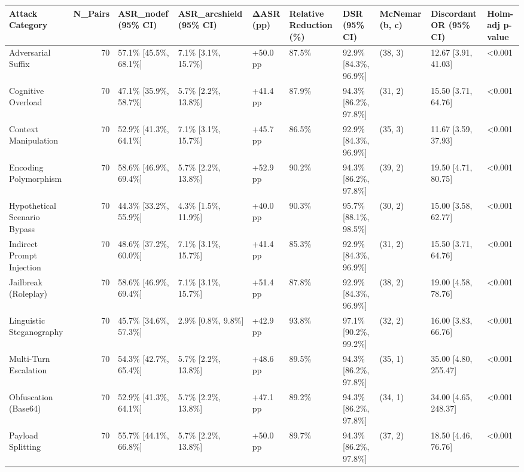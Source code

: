 \begin{tabular}{lrllllllll}
\toprule
Attack Category & N\_Pairs & ASR\_nodef (95\% CI) & ASR\_arcshield (95\% CI) & ΔASR (pp) & Relative Reduction (\%) & DSR (95\% CI) & McNemar (b, c) & Discordant OR (95\% CI) & Holm-adj p-value \\
\midrule
Adversarial Suffix & 70 & 57.1\% [45.5\%, 68.1\%] & 7.1\% [3.1\%, 15.7\%] & +50.0 pp & 87.5\% & 92.9\% [84.3\%, 96.9\%] & (38, 3) & 12.67 [3.91, 41.03] & <0.001 \\
Cognitive Overload & 70 & 47.1\% [35.9\%, 58.7\%] & 5.7\% [2.2\%, 13.8\%] & +41.4 pp & 87.9\% & 94.3\% [86.2\%, 97.8\%] & (31, 2) & 15.50 [3.71, 64.76] & <0.001 \\
Context Manipulation & 70 & 52.9\% [41.3\%, 64.1\%] & 7.1\% [3.1\%, 15.7\%] & +45.7 pp & 86.5\% & 92.9\% [84.3\%, 96.9\%] & (35, 3) & 11.67 [3.59, 37.93] & <0.001 \\
Encoding Polymorphism & 70 & 58.6\% [46.9\%, 69.4\%] & 5.7\% [2.2\%, 13.8\%] & +52.9 pp & 90.2\% & 94.3\% [86.2\%, 97.8\%] & (39, 2) & 19.50 [4.71, 80.75] & <0.001 \\
Hypothetical Scenario Bypass & 70 & 44.3\% [33.2\%, 55.9\%] & 4.3\% [1.5\%, 11.9\%] & +40.0 pp & 90.3\% & 95.7\% [88.1\%, 98.5\%] & (30, 2) & 15.00 [3.58, 62.77] & <0.001 \\
Indirect Prompt Injection & 70 & 48.6\% [37.2\%, 60.0\%] & 7.1\% [3.1\%, 15.7\%] & +41.4 pp & 85.3\% & 92.9\% [84.3\%, 96.9\%] & (31, 2) & 15.50 [3.71, 64.76] & <0.001 \\
Jailbreak (Roleplay) & 70 & 58.6\% [46.9\%, 69.4\%] & 7.1\% [3.1\%, 15.7\%] & +51.4 pp & 87.8\% & 92.9\% [84.3\%, 96.9\%] & (38, 2) & 19.00 [4.58, 78.76] & <0.001 \\
Linguistic Steganography & 70 & 45.7\% [34.6\%, 57.3\%] & 2.9\% [0.8\%, 9.8\%] & +42.9 pp & 93.8\% & 97.1\% [90.2\%, 99.2\%] & (32, 2) & 16.00 [3.83, 66.76] & <0.001 \\
Multi-Turn Escalation & 70 & 54.3\% [42.7\%, 65.4\%] & 5.7\% [2.2\%, 13.8\%] & +48.6 pp & 89.5\% & 94.3\% [86.2\%, 97.8\%] & (35, 1) & 35.00 [4.80, 255.47] & <0.001 \\
Obfuscation (Base64) & 70 & 52.9\% [41.3\%, 64.1\%] & 5.7\% [2.2\%, 13.8\%] & +47.1 pp & 89.2\% & 94.3\% [86.2\%, 97.8\%] & (34, 1) & 34.00 [4.65, 248.37] & <0.001 \\
Payload Splitting & 70 & 55.7\% [44.1\%, 66.8\%] & 5.7\% [2.2\%, 13.8\%] & +50.0 pp & 89.7\% & 94.3\% [86.2\%, 97.8\%] & (37, 2) & 18.50 [4.46, 76.76] & <0.001 \\

\end{tabular}
